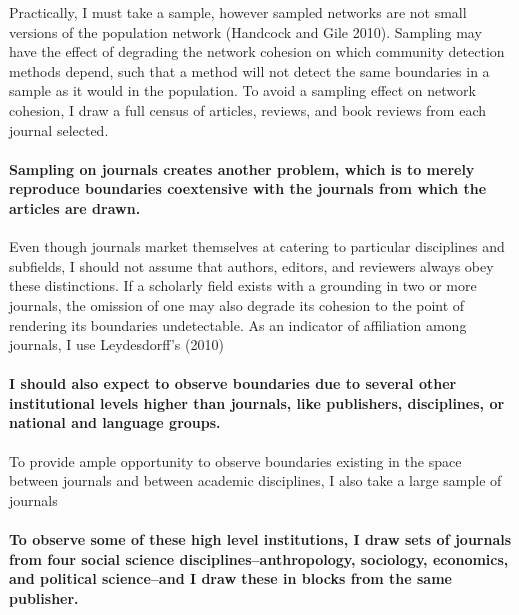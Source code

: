 \documentclass[]{article}
\begin{document}
Practically, I must take a sample, however sampled networks are not
small versions of the population network (Handcock and Gile 2010).
Sampling may have the effect of degrading the network cohesion on which
community detection methods depend, such that a method will not detect
the same boundaries in a sample as it would in the population. To avoid
a sampling effect on network cohesion, I draw a full census of articles,
reviews, and book reviews from each journal selected.

\paragraph{Sampling on journals creates another problem, which is to
merely reproduce boundaries coextensive with the journals from which the
articles are
drawn.}\label{sampling-on-journals-creates-another-problem-which-is-to-merely-reproduce-boundaries-coextensive-with-the-journals-from-which-the-articles-are-drawn.}

Even though journals market themselves at catering to particular
disciplines and subfields, I should not assume that authors, editors,
and reviewers always obey these distinctions. If a scholarly field
exists with a grounding in two or more journals, the omission of one may
also degrade its cohesion to the point of rendering its boundaries
undetectable. As an indicator of affiliation among journals, I use
Leydesdorff's (2010)

\paragraph{I should also expect to observe boundaries due to several
other institutional levels higher than journals, like publishers,
disciplines, or national and language
groups.}\label{i-should-also-expect-to-observe-boundaries-due-to-several-other-institutional-levels-higher-than-journals-like-publishers-disciplines-or-national-and-language-groups.}

To provide ample opportunity to observe boundaries existing in the space
between journals and between academic disciplines, I also take a large
sample of journals

\paragraph{To observe some of these high level institutions, I draw sets
of journals from four social science disciplines--anthropology,
sociology, economics, and political science--and I draw these in blocks
from the same
publisher.}\label{to-observe-some-of-these-high-level-institutions-i-draw-sets-of-journals-from-four-social-science-disciplinesanthropology-sociology-economics-and-political-scienceand-i-draw-these-in-blocks-from-the-same-publisher.}
\end{document}
